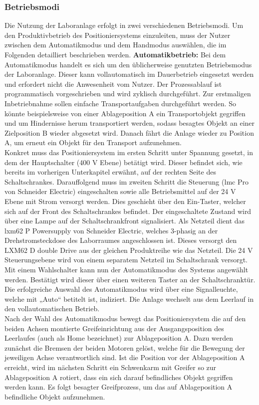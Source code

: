 \documentclass[../Bachelorarbeit.tex]{subfiles}
\begin{document}
\subsubsection{Betriebsmodi}
Die Nutzung der Laboranlage erfolgt in zwei verschiedenen Betriebsmodi. Um den Produktivbetrieb des Positioniersystems einzuleiten, muss der Nutzer zwischen dem Automatikmodus und dem Handmodus auswählen, die im Folgenden detailliert beschrieben werden.
\bigskip
\newline
\textbf{Automatikbetrieb:} Bei dem Automatikmodus handelt es sich um den üblicherweise genutzten Betriebsmodus der Laboranlage. Dieser kann vollautomatisch im Dauerbetrieb eingesetzt werden und erfordert nicht die Anwesenheit vom Nutzer. Der Prozessablauf ist programmatisch vorgeschrieben und wird zyklisch durchgeführt. Zur erstmaligen Inbetriebnahme sollen einfache Transportaufgaben durchgeführt werden. So könnte beispielsweise von einer Ablageposition A ein Transportobjekt gegriffen und um Hindernisse herum transportiert werden, sodass besagtes Objekt an einer Zielposition B wieder abgesetzt wird. Danach fährt die Anlage wieder zu Position A, um erneut ein Objekt für den Transport aufzunehmen.\\
Konkret muss das Positioniersystem im ersten Schritt unter Spannung gesetzt, in dem der Hauptschalter (400 V Ebene) betätigt wird. Dieser befindet sich, wie bereits im vorherigen Unterkapitel erwähnt, auf der rechten Seite des Schaltschrankes. Darauffolgend muss im zweiten Schritt die Steuerung (\acs{lmc} Pro von Schneider Electric) eingeschalten sowie alle Betriebsmittel auf der 24 V Ebene mit Strom versorgt werden. Dies geschieht über den Ein-Taster, welcher sich auf der Front des Schaltschrankes befindet. Der eingeschaltete Zustand wird über eine Lampe auf der Schaltschrankfront signalisiert. Als Netzteil dient das \acs{lxm}62 P Powersupply von Schneider Electric, welches 3-phasig an der Drehstromsteckdose des Laborraumes angeschlossen ist. Dieses versorgt den LXM62 D double Drive aus der gleichen Produktreihe wie das Netzteil. Die 24 V Steuerungsebene wird von einem separatem Netzteil im Schaltschrank versorgt. Mit einem Wahlschalter kann nun der Automatikmodus des Systems angewählt werden. Bestätigt wird dieser über einen weiteren Taster an der Schaltschranktür. Die erfolgreiche Auswahl des Automatikmodus wird über eine Signalleuchte, welche mit „Auto“ betitelt ist, indiziert. Die Anlage wechselt aus dem Leerlauf in den vollautomatischen Betrieb.\\ 
Nach der Wahl des Automatikmodus bewegt das Positioniersystem die auf den beiden Achsen montierte Greifeinrichtung aus der Ausgangsposition des Leerlaufes (auch als Home bezeichnet) zur Ablageposition A. Dazu werden zunächst die Bremsen der beiden Motoren gelöst, welche für die Bewegung der jeweiligen Achse verantwortlich sind. Ist die Position vor der Ablageposition A erreicht, wird im nächsten Schritt ein Schwenkarm mit Greifer so zur Ablageposition A rotiert, dass ein sich darauf befindliches Objekt gegriffen werden kann. Es folgt besagter Greifprozess, um das auf Ablageposition A befindliche Objekt aufzunehmen.\\
\end{document}
